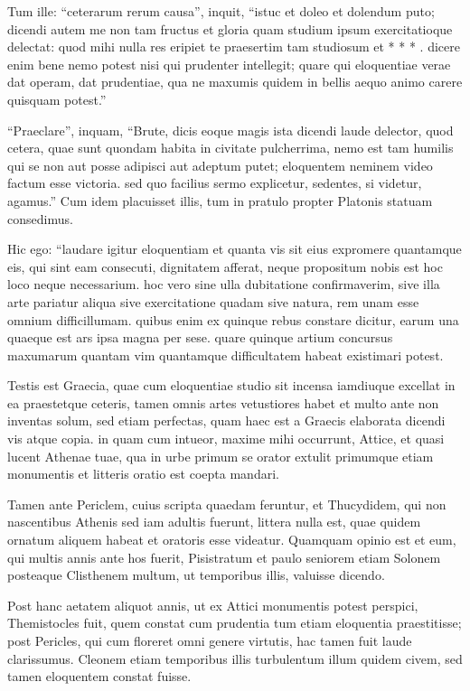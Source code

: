 Tum ille: ``ceterarum rerum causa'', inquit, ``istuc et doleo et dolendum puto; dicendi autem me non tam fructus et gloria quam studium ipsum exercitatioque delectat: quod mihi nulla res eripiet te praesertim tam studiosum et * * * . dicere enim bene nemo potest nisi qui prudenter intellegit; quare qui eloquentiae verae dat operam, dat prudentiae, qua ne maxumis quidem in bellis aequo animo carere quisquam potest.''

``Praeclare'', inquam, ``Brute, dicis eoque magis ista dicendi laude delector, quod cetera, quae sunt quondam habita in civitate pulcherrima, nemo est tam humilis qui se non aut posse adipisci aut adeptum putet; eloquentem neminem video factum esse victoria. sed quo facilius sermo explicetur, sedentes, si videtur, agamus.'' Cum idem placuisset illis, tum in pratulo propter Platonis statuam consedimus.

Hic ego: ``laudare igitur eloquentiam et quanta vis sit eius expromere quantamque eis, qui sint eam consecuti, dignitatem afferat, neque propositum nobis est hoc loco neque necessarium. hoc vero sine ulla dubitatione confirmaverim, sive illa arte pariatur aliqua sive exercitatione quadam sive natura, rem unam esse omnium difficillumam. quibus enim ex quinque rebus constare dicitur, earum una quaeque est ars ipsa magna per sese. quare quinque artium concursus maxumarum quantam vim quantamque difficultatem habeat existimari potest.

Testis est Graecia, quae cum eloquentiae studio sit incensa iamdiuque excellat in ea praestetque ceteris, tamen omnis artes vetustiores habet et multo ante non inventas solum, sed etiam perfectas, quam haec est a Graecis elaborata dicendi vis atque copia. in quam cum intueor, maxime mihi occurrunt, Attice, et quasi lucent Athenae tuae, qua in urbe primum se orator extulit primumque etiam monumentis et litteris oratio est coepta mandari.

Tamen ante Periclem, cuius scripta quaedam feruntur, et Thucydidem, qui non nascentibus Athenis sed iam adultis fuerunt, littera nulla est, quae quidem ornatum aliquem habeat et oratoris esse videatur. Quamquam opinio est et eum, qui multis annis ante hos fuerit, Pisistratum et paulo seniorem etiam Solonem posteaque Clisthenem multum, ut temporibus illis, valuisse dicendo.

Post hanc aetatem aliquot annis, ut ex Attici monumentis potest perspici, Themistocles fuit, quem constat cum prudentia tum etiam eloquentia praestitisse; post Pericles, qui cum floreret omni genere virtutis, hac tamen fuit laude clarissumus. Cleonem etiam temporibus illis turbulentum illum quidem civem, sed tamen eloquentem constat fuisse.

